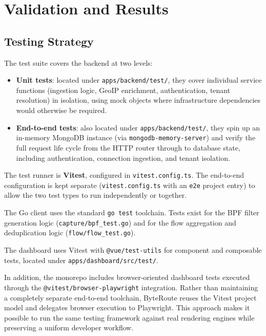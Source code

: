 \documentclass[12pt]{report}
\begin{document}
\chapter{Validation and Results}
\label{chap:validation}

\section{Testing Strategy}

The test suite covers the backend at two levels:

\begin{itemize}
  \item \textbf{Unit tests}: located under \texttt{apps/backend/test/}, they
    cover individual service functions (ingestion logic, GeoIP enrichment,
    authentication, tenant resolution) in isolation, using mock objects where
    infrastructure dependencies would otherwise be required.
  \item \textbf{End-to-end tests}: also located under
    \texttt{apps/backend/test/}, they spin up an in-memory MongoDB instance
    (via \texttt{mongodb-memory-server}) and verify the full request life cycle
    from the HTTP router through to database state, including authentication,
    connection ingestion, and tenant isolation.
\end{itemize}

The test runner is \textbf{Vitest}, configured in \texttt{vitest.config.ts}.
The end-to-end configuration is kept separate (\texttt{vitest.config.ts} with
an \texttt{e2e} project entry) to allow the two test types to run independently
or together.

The Go client uses the standard \texttt{go test} toolchain. Tests exist for the
BPF filter generation logic (\texttt{capture/bpf\_test.go}) and for the flow
aggregation and deduplication logic (\texttt{flow/flow\_test.go}).

The dashboard uses Vitest with \texttt{@vue/test-utils} for component and
composable tests, located under \texttt{apps/dashboard/src/test/}.

In addition, the monorepo includes browser-oriented dashboard tests executed
through the \texttt{@vitest/browser-playwright} integration. Rather than
maintaining a completely separate end-to-end toolchain, ByteRoute reuses the
Vitest project model and delegates browser execution to Playwright. This
approach makes it possible to run the same testing framework against real
rendering engines while preserving a uniform developer workflow.
\end{document}
